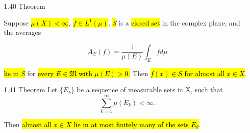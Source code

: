 \documentclass{article}
\begin{document}
\begin{theo}{1.40 Theorem}

Suppose \hl{$\mu(X)<\infty$}, \hl{$f\in L^1(\mu)$}, \hl{\textit{S}} is a \hl{closed set} in the complex plane, and the averages

\begin{displaymath}
  A_E(f)=\frac{1}{\mu(E)}\int_E fd\mu
\end{displaymath}

\hl{lie in \textit{S}} for\hl{ every $E\in\mathfrak{M}$ with $\mu(E)>0$.} Then \hl{$f(x)\in S$ for almost all $x \in X$}.
\end{theo}

\begin{theo}{1.41 Theorem}
Let $\{E_k\}$ be a sequence of measurable sets in X, such that
\begin{displaymath}
  \sum^\infty_{k=1}\mu(E_k)<\infty.
\end{displaymath}

Then \hl{almost all $x \in X$ lie in at most finitely many of the sets $E_k$}.

\end{theo}
\end{document}
